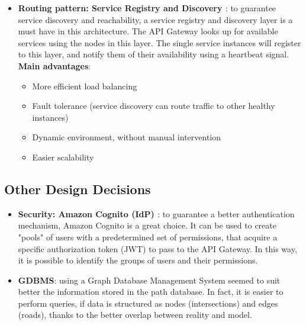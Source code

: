 \begin{itemize}
    \item \textbf{Routing pattern: Service Registry and Discovery \cite{registry}}: to guarantee service discovery and reachability, a service registry and discovery layer is a must have in this architecture. The API Gateway looks up for available services using the nodes in this layer. The single service instances will register to this layer, and notify them of their availability using a heartbeat signal.\newline
    \textbf{Main advantages}:
            \begin{itemize}[label = -]
                \item More efficient load balancing
                \item Fault tolerance (service discovery can route traffic to other healthy instances)
                \item Dynamic environment, without manual intervention
                \item Easier scalability
            \end{itemize}

\end{itemize}
\subsection{Other Design Decisions}
\begin{itemize} 

    \item \textbf{Security: Amazon Cognito (IdP) \cite{cognito}}: to guarantee a better authentication mechanism, Amazon Cognito is a great choice. It can be used to create "pools" of users with a predetermined set of permissions, that acquire a specific authorization token (JWT) to pass to the API Gateway. In this way, it is possible to identify the groups of users and their permissions.
    
    \item \textbf{GDBMS}: using a Graph Database Management System seemed to suit better the information stored in the path database. In fact, it is easier to perform queries, if data is structured as nodes (intersections) and edges (roads), thanks to the better overlap between reality and model.

\end{itemize}



